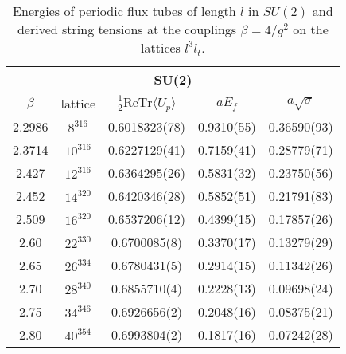 \documentclass[12pt]{article}
\begin{document}
\begin{table}[htb]
\centering
\begin{tabular}{|cc|ccc|} \hline
\multicolumn{5}{|c||}{SU(2)} \\ \hline
$\beta$ & lattice & $\tfrac{1}{2}\text{ReTr}\langle U_p\rangle$ & $aE_f$ & $a\surd\sigma$ \\ \hline
2.2986  & $8^316$   & 0.6018323(78)  & 0.9310(55) & 0.36590(93)   \\
2.3714  & $10^316$  & 0.6227129(41)  & 0.7159(41) & 0.28779(71)   \\
2.427   & $12^316$  & 0.6364295(26)  & 0.5831(32) & 0.23750(56)   \\
2.452   & $14^320$  & 0.6420346(28)  & 0.5852(51) & 0.21791(83)   \\
2.509   & $16^320$  & 0.6537206(12)  & 0.4399(15) & 0.17857(26)   \\
2.60    & $22^330$  & 0.6700085(8)   & 0.3370(17) & 0.13279(29)   \\
2.65    & $26^334$  & 0.6780431(5)   & 0.2914(15) & 0.11342(26)   \\
2.70    & $28^340$  & 0.6855710(4)   & 0.2228(13) & 0.09698(24)   \\
2.75    & $34^346$  & 0.6926656(2)   & 0.2048(16) & 0.08375(21)   \\
2.80    & $40^354$  & 0.6993804(2)   & 0.1817(16) & 0.07242(28)   \\ \hline
\end{tabular}
\caption{Energies of periodic flux tubes of length $l$ in $SU(2)$ and derived string tensions
  at the couplings $\beta=4/g^2$ on the lattices $l^3l_t$.}
\label{table_Ksmall_SU2}
\end{table}
\end{document}
